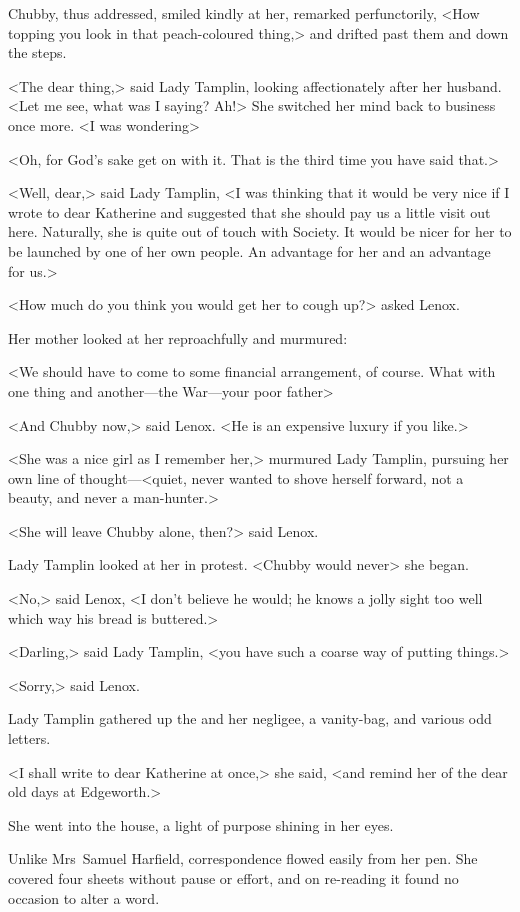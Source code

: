 Chubby, thus addressed, smiled kindly at her, remarked perfunctorily, <How topping you look in that peach-coloured thing,> and drifted past them and down the steps.

<The dear thing,> said Lady Tamplin, looking affectionately after her husband. <Let me see, what was I saying? Ah!> She switched her mind back to business once more. <I was wondering\longdash>

<Oh, for God's sake get on with it. That is the third time you have said that.>

<Well, dear,> said Lady Tamplin, <I was thinking that it would be very nice if I wrote to dear Katherine and suggested that she should pay us a little visit out here. Naturally, she is quite out of touch with Society. It would be nicer for her to be launched by one of her own people. An advantage for her and an advantage for us.>

<How much do you think you would get her to cough up?> asked Lenox.

Her mother looked at her reproachfully and murmured:

<We should have to come to some financial arrangement, of course. What with one thing and another—the War—your poor father\longdash>

<And Chubby now,> said Lenox. <He is an expensive luxury if you like.>

<She was a nice girl as I remember her,> murmured Lady Tamplin, pursuing her own line of thought—<quiet, never wanted to shove herself forward, not a beauty, and never a man-hunter.>

<She will leave Chubby alone, then?> said Lenox.

Lady Tamplin looked at her in protest. <Chubby would never\longdash> she began.

<No,> said Lenox, <I don't believe he would; he knows a jolly sight too well which way his bread is buttered.>

<Darling,> said Lady Tamplin, <you have such a coarse way of putting things.>

<Sorry,> said Lenox.

Lady Tamplin gathered up the  and her negligee, a vanity-bag, and various odd letters.

<I shall write to dear Katherine at once,> she said, <and remind her of the dear old days at Edgeworth.>

She went into the house, a light of purpose shining in her eyes.

Unlike Mrs~Samuel Harfield, correspondence flowed easily from her pen. She covered four sheets without pause or effort, and on re-reading it found no occasion to alter a word.

